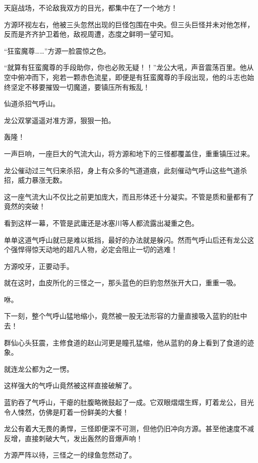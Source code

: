 
\begin{this_body}



天庭战场，不论敌我双方的目光，都集中在了一个地方！

方源环视左右，他被三头忽然出现的巨怪包围在中央。但三头巨怪并未对他怎样，反而是齐齐护卫着他，敌视周遭，态度之鲜明一望可知。

“狂蛮魔尊……”方源一脸震惊之色。

“就算有狂蛮魔尊的手段助你，你也必败无疑！！”龙公大吼，声音震荡百里。他从空中俯冲而下，宛若一颗赤色流星，即便是有狂蛮魔尊的手段出现，他的斗志也始终坚定不移要摧毁一切魔道，要镇压所有叛乱！

仙道杀招气呼山。

龙公双掌遥遥对准方源，狠狠一拍。

轰隆！

一声巨响，一座巨大的气流大山，将方源和地下的三怪都覆盖住，重重镇压过来。

龙公催动过三气归来杀招，身上有众多的气道道痕，此刻催动气呼山这些气道杀招，威力暴涨无数。

这一座气流大山不仅比之前更加庞大，而且形体还十分凝实。不管是质和量都有了竟然的突破！

看到这样一幕，不管是武庸还是冰塞川等人都流露出凝重之色。

单单这道气呼山就已是难以抵挡，最好的办法就是躲闪。然而气呼山后还有龙公这个强悍得惊天动地的超凡人物，必定会阻止一切的逃难！

方源咬牙，正要动手。

就在这时，血皮所化的三怪之一，那头蓝色的巨豹忽然张开大口，重重一吸。

咻。

下一刻，整个气呼山猛地缩小，竟然被一股无法形容的力量直接吸入蓝豹的肚中去！

群仙心头狂震，主修食道的赵山河更是瞳孔猛缩，他从蓝豹的身上看到了食道的迹象。

就连龙公都为之一愣。

这样强大的气呼山竟然被这样直接破解了。

蓝豹吞了气呼山，干瘪的肚腹略微鼓起了一成。它双眼熠熠生辉，盯着龙公，目光令人悚然，仿佛是盯着一份鲜美的大餐！

龙公有着大无畏的勇悍，三怪即便深不可测，但他仍旧冲向方源。甚至他速度不减反增，直接刺破大气，发出轰然的音爆声响！

方源严阵以待，三怪之一的绿鱼忽然动了。


\end{this_body}
